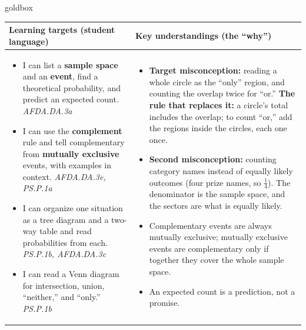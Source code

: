 \documentclass[10pt]{article}
\begin{document}
\renewcommand{\arraystretch}{1.4}
\boxguard
\begin{skillbox}{goldbox}
\begin{tabularx}{\linewidth}{@{}X|X@{}}
\textbf{Learning targets (student language)} & \textbf{Key understandings (the ``why'')} \\[2pt]
\hline
\vspace{-6pt}
\begin{itemize}[leftmargin=1.1em, nosep, after=\vspace{2pt}]
  \item I can list a \textbf{sample space} and an \textbf{event}, find a theoretical probability,
        and predict an expected count. \hfill \textit{AFDA.DA.3a}
  \item I can use the \textbf{complement} rule and tell complementary from \textbf{mutually
        exclusive} events, with examples in context. \hfill \textit{AFDA.DA.3e, PS.P.1a}
  \item I can organize one situation as a tree diagram and a two-way table and read
        probabilities from each. \hfill \textit{PS.P.1b, AFDA.DA.3c}
  \item I can read a Venn diagram for intersection, union, ``neither,'' and ``only.''
        \hfill \textit{PS.P.1b}
\end{itemize}
&
\vspace{-6pt}
\begin{itemize}[leftmargin=1.1em, nosep, after=\vspace{2pt}]
  \item \textbf{Target misconception:} reading a whole circle as the ``only'' region, and counting
        the overlap twice for ``or.'' \textbf{The rule that replaces it:} a circle's total
        includes the overlap; to count ``or,'' add the regions inside the circles, each one once.
  \item \textbf{Second misconception:} counting category names instead of equally likely outcomes
        (four prize names, so $\frac14$). The denominator is the sample space, and the sectors
        are what is equally likely.
  \item Complementary events are always mutually exclusive; mutually exclusive events are
        complementary only if together they cover the whole sample space.
  \item An expected count is a prediction, not a promise.
\end{itemize}
\end{tabularx}
\end{skillbox}
\end{document}
